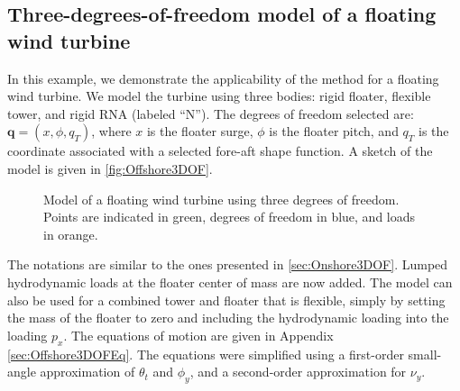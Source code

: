 \documentclass[wes, manuscript]{copernicus}
\renewcommand{\v}[1]{\boldsymbol{#1}}
\begin{document}
\subsection{Three-degrees-of-freedom model of a floating wind turbine}
\label{sec:Offshore3DOF}
In this example, we demonstrate the applicability of the method for a floating wind turbine.
We model the turbine using three bodies: rigid floater, flexible tower, and rigid RNA (labeled ``N'').
The degrees of freedom selected are: $\v{q}=(x,\phi,q_T)$, where $x$ is the floater surge, $\phi$ is the floater pitch, and $q_T$ is the coordinate associated with a selected fore-aft shape function. 
A sketch of the model is given in \autoref{fig:Offshore3DOF}. 
\begin{figure}[!htb]%
 \centering%
 \def\svgwidth{0.6\columnwidth}%
 \caption{Model of a floating wind turbine using three degrees of freedom. Points are indicated in green, degrees of freedom in blue, and loads in orange.}\label{fig:Offshore3DOF}%
 \end{figure}%
The notations are similar to the ones presented in \autoref{sec:Onshore3DOF}.
Lumped hydrodynamic loads at the floater center of mass are now added.
The model can also be used for a combined tower and floater that is flexible, simply by setting the mass of the floater to zero and including the hydrodynamic loading into the loading $p_x$.
The equations of motion are given in Appendix \ref{sec:Offshore3DOFEq}.
The equations were simplified using a first-order small-angle approximation of $\theta_t$ and $\phi_y$, and a second-order approximation for $\nu_y$.
\end{document}
